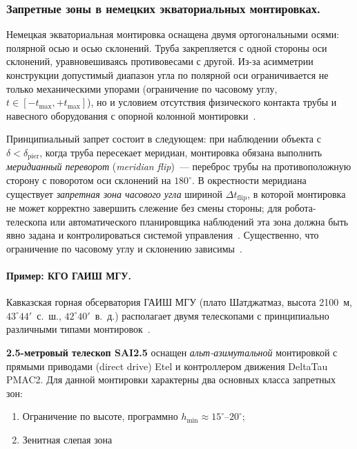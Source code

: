 \subsubsection{Запретные зоны в немецких экваториальных монтировках.} Немецкая экваториальная монтировка оснащена двумя ортогональными осями: полярной осью и осью склонений. Труба закрепляется с одной стороны оси склонений, уравновешиваясь противовесами с другой. Из-за асимметрии конструкции допустимый диапазон угла по полярной оси ограничивается не только механическими упорами (ограничение по часовому углу, $t \in [-t_{\max}, +t_{\max}]$), но и условием отсутствия физического контакта трубы и навесного оборудования с опорной колонной монтировки~\cite{TPoint_Wallace}.

Принципиальный запрет состоит в следующем: при наблюдении объекта с $\delta < \delta_{\mathrm{pier}}$, когда труба пересекает меридиан, монтировка обязана выполнить \textit{меридианный переворот} (\textit{meridian flip})~--- переброс трубы на противоположную сторону с поворотом оси склонений на $180^\circ$. В окрестности меридиана существует \textit{запретная зона часового угла} шириной $\Delta t_{\mathrm{flip}}$, в которой монтировка не может корректно завершить слежение без смены стороны; для робота-телескопа или автоматического планировщика наблюдений эта зона должна быть явно задана и контролироваться системой управления~\cite{EQMOD_Limits}\cite{EKOS_Flip}. Существенно, что ограничение по часовому углу и склонению зависимы~\cite{TPoint_Wallace}.

\paragraph{Пример: КГО ГАИШ МГУ.}

Кавказская горная обсерватория ГАИШ МГУ (плато Шатджатмаз, высота 2100~м, $43^\circ44'$~с.~ш., $42^\circ40'$~в.~д.) располагает двумя телескопами с принципиально различными типами монтировок~\cite{Shatsky2020}.

\textbf{2.5-метровый телескоп SAI2.5} оснащен \textit{альт-азимутальной} монтировкой с прямыми приводами (direct drive) Etel и контроллером движения DeltaTau PMAC2. Для данной монтировки характерны два основных класса запретных зон: 

\begin{enumerate}
    \item Ограничение по высоте, программно $h_{\min} \approx 15^\circ$--$20^\circ$; 
    \item Зенитная слепая зона
\end{enumerate}

